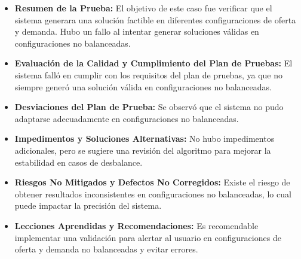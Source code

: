 \documentclass[stu, 12pt, letterpaper, donotrepeattitle, floatsintext, natbib]{apa7}
\begin{document}
\begin{itemize}
    \item \textbf{Resumen de la Prueba:} El objetivo de este caso fue verificar que el sistema generara una solución factible en diferentes configuraciones de oferta y demanda. Hubo un fallo al intentar generar soluciones válidas en configuraciones no balanceadas.
    
    \item \textbf{Evaluación de la Calidad y Cumplimiento del Plan de Pruebas:} El sistema falló en cumplir con los requisitos del plan de pruebas, ya que no siempre generó una solución válida en configuraciones no balanceadas.
    
    \item \textbf{Desviaciones del Plan de Prueba:} Se observó que el sistema no pudo adaptarse adecuadamente en configuraciones no balanceadas.
    
    \item \textbf{Impedimentos y Soluciones Alternativas:} No hubo impedimentos adicionales, pero se sugiere una revisión del algoritmo para mejorar la estabilidad en casos de desbalance.
    
    \item \textbf{Riesgos No Mitigados y Defectos No Corregidos:} Existe el riesgo de obtener resultados inconsistentes en configuraciones no balanceadas, lo cual puede impactar la precisión del sistema.
    
    \item \textbf{Lecciones Aprendidas y Recomendaciones:} Es recomendable implementar una validación para alertar al usuario en configuraciones de oferta y demanda no balanceadas y evitar errores.
\end{itemize}
\end{document}
